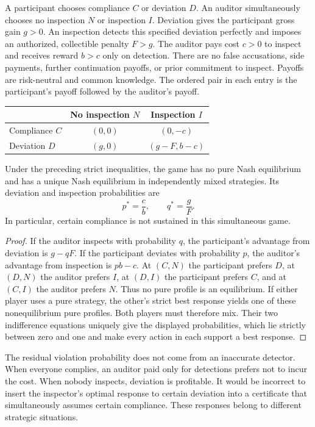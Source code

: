 A participant chooses compliance $C$ or deviation $D$. An auditor simultaneously chooses no inspection $N$ or inspection $I$. Deviation gives the participant gross gain $g>0$. An inspection detects this specified deviation perfectly and imposes an authorized, collectible penalty $F>g$. The auditor pays cost $c>0$ to inspect and receives reward $b>c$ only on detection. There are no false accusations, side payments, further continuation payoffs, or prior commitment to inspect. Payoffs are risk-neutral and common knowledge. The ordered pair in each entry is the participant's payoff followed by the auditor's payoff.

\begin{center}
\begin{tabular}{@{}lcc@{}}
\toprule
 & No inspection $N$ & Inspection $I$\\
\midrule
Compliance $C$ & $(0,0)$ & $(0,-c)$\\
Deviation $D$ & $(g,0)$ & $(g-F,b-c)$\\
\bottomrule
\end{tabular}
\end{center}

\begin{MSproposition}\label{MS:prop:strategic-inspector}
Under the preceding strict inequalities, the game has no pure Nash equilibrium and has a unique Nash equilibrium in independently mixed strategies. Its deviation and inspection probabilities are
\[
p^*=\frac{c}{b},\qquad q^*=\frac{g}{F}.
\]
In particular, certain compliance is not sustained in this simultaneous game.
\end{MSproposition}
\begin{proof}
If the auditor inspects with probability $q$, the participant's advantage from deviation is $g-qF$. If the participant deviates with probability $p$, the auditor's advantage from inspection is $pb-c$. At $(C,N)$ the participant prefers $D$, at $(D,N)$ the auditor prefers $I$, at $(D,I)$ the participant prefers $C$, and at $(C,I)$ the auditor prefers $N$. Thus no pure profile is an equilibrium. If either player uses a pure strategy, the other's strict best response yields one of these nonequilibrium pure profiles. Both players must therefore mix. Their two indifference equations uniquely give the displayed probabilities, which lie strictly between zero and one and make every action in each support a best response.
\end{proof}

The residual violation probability does not come from an inaccurate detector. When everyone complies, an auditor paid only for detections prefers not to incur the cost. When nobody inspects, deviation is profitable. It would be incorrect to insert the inspector's optimal response to certain deviation into a certificate that simultaneously assumes certain compliance. These responses belong to different strategic situations.

